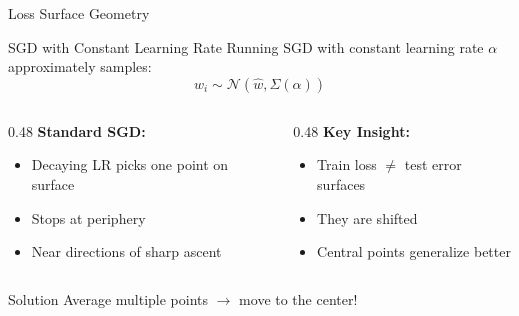 \documentclass{beamer}
\begin{document}
\begin{frame}{Loss Surface Geometry}

\begin{block}{SGD with Constant Learning Rate}
Running SGD with constant learning rate $\alpha$ approximately samples:
\begin{equation*}
w_i \sim \mathcal{N}(\hat{w}, \Sigma(\alpha))
\end{equation*}
\end{block}

\begin{columns}[T]
\begin{column}{0.48\textwidth}
\textbf{Standard SGD:}
\begin{itemize}
    \item Decaying LR picks one point on surface
    \item Stops at periphery
    \item Near directions of sharp ascent
\end{itemize}
\end{column}

\begin{column}{0.48\textwidth}
\textbf{Key Insight:}
\begin{itemize}
    \item Train loss $\neq$ test error surfaces
    \item They are shifted
    \item Central points generalize better
\end{itemize}
\end{column}
\end{columns}

\vspace{0.3cm}

\begin{block}{Solution}
Average multiple points $\rightarrow$ move to the center!
\end{block}

\end{frame}
\end{document}
